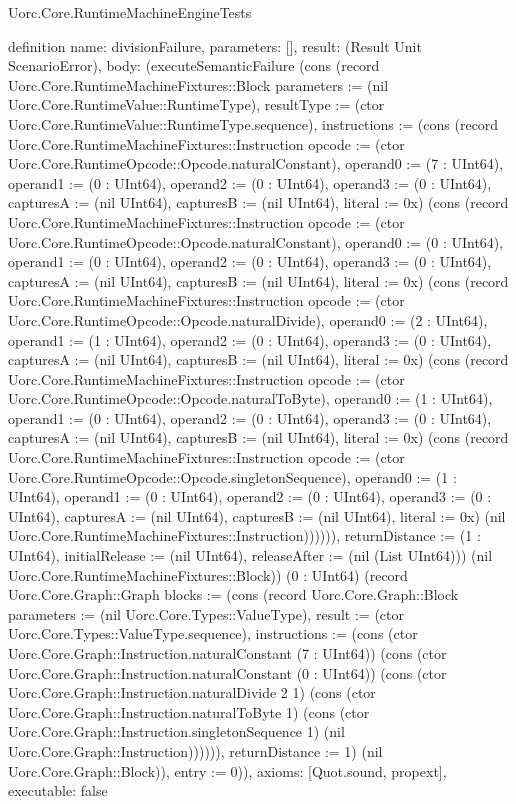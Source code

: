 \begin{lexlean}{Uorc.Core.RuntimeMachineEngineTests}
\begin{semanticmodule}
definition{
  name: divisionFailure,
  parameters: [],
  result: (Result Unit ScenarioError),
  body: (executeSemanticFailure (cons (record Uorc.Core.RuntimeMachineFixtures::Block {parameters := (nil Uorc.Core.RuntimeValue::RuntimeType), resultType := (ctor Uorc.Core.RuntimeValue::RuntimeType.sequence), instructions := (cons (record Uorc.Core.RuntimeMachineFixtures::Instruction {opcode := (ctor Uorc.Core.RuntimeOpcode::Opcode.naturalConstant), operand0 := (7 : UInt64), operand1 := (0 : UInt64), operand2 := (0 : UInt64), operand3 := (0 : UInt64), capturesA := (nil UInt64), capturesB := (nil UInt64), literal := 0x}) (cons (record Uorc.Core.RuntimeMachineFixtures::Instruction {opcode := (ctor Uorc.Core.RuntimeOpcode::Opcode.naturalConstant), operand0 := (0 : UInt64), operand1 := (0 : UInt64), operand2 := (0 : UInt64), operand3 := (0 : UInt64), capturesA := (nil UInt64), capturesB := (nil UInt64), literal := 0x}) (cons (record Uorc.Core.RuntimeMachineFixtures::Instruction {opcode := (ctor Uorc.Core.RuntimeOpcode::Opcode.naturalDivide), operand0 := (2 : UInt64), operand1 := (1 : UInt64), operand2 := (0 : UInt64), operand3 := (0 : UInt64), capturesA := (nil UInt64), capturesB := (nil UInt64), literal := 0x}) (cons (record Uorc.Core.RuntimeMachineFixtures::Instruction {opcode := (ctor Uorc.Core.RuntimeOpcode::Opcode.naturalToByte), operand0 := (1 : UInt64), operand1 := (0 : UInt64), operand2 := (0 : UInt64), operand3 := (0 : UInt64), capturesA := (nil UInt64), capturesB := (nil UInt64), literal := 0x}) (cons (record Uorc.Core.RuntimeMachineFixtures::Instruction {opcode := (ctor Uorc.Core.RuntimeOpcode::Opcode.singletonSequence), operand0 := (1 : UInt64), operand1 := (0 : UInt64), operand2 := (0 : UInt64), operand3 := (0 : UInt64), capturesA := (nil UInt64), capturesB := (nil UInt64), literal := 0x}) (nil Uorc.Core.RuntimeMachineFixtures::Instruction)))))), returnDistance := (1 : UInt64), initialRelease := (nil UInt64), releaseAfter := (nil (List UInt64))}) (nil Uorc.Core.RuntimeMachineFixtures::Block)) (0 : UInt64) (record Uorc.Core.Graph::Graph {blocks := (cons (record Uorc.Core.Graph::Block {parameters := (nil Uorc.Core.Types::ValueType), result := (ctor Uorc.Core.Types::ValueType.sequence), instructions := (cons (ctor Uorc.Core.Graph::Instruction.naturalConstant (7 : UInt64)) (cons (ctor Uorc.Core.Graph::Instruction.naturalConstant (0 : UInt64)) (cons (ctor Uorc.Core.Graph::Instruction.naturalDivide 2 1) (cons (ctor Uorc.Core.Graph::Instruction.naturalToByte 1) (cons (ctor Uorc.Core.Graph::Instruction.singletonSequence 1) (nil Uorc.Core.Graph::Instruction)))))), returnDistance := 1}) (nil Uorc.Core.Graph::Block)), entry := 0})),
  axioms: [Quot.sound, propext],
  executable: false
}


\end{semanticmodule}
\end{lexlean}
